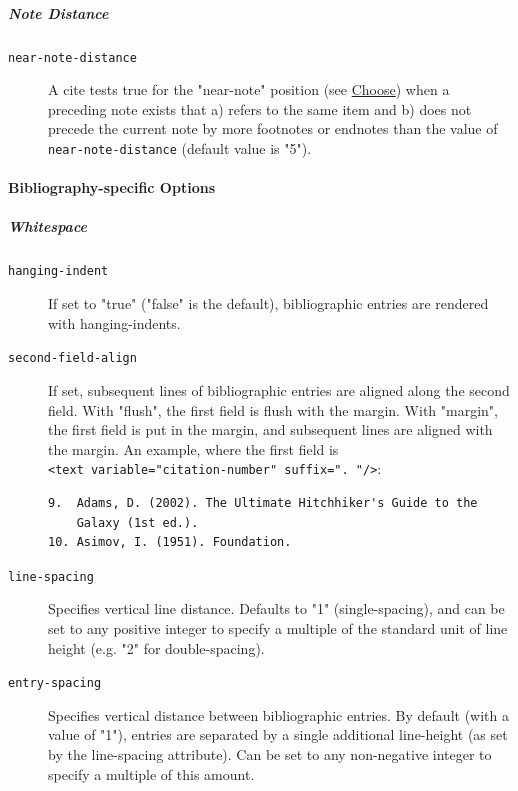 \hypertarget{note-distance}{%
\subparagraph{Note Distance}\label{note-distance}}

\begin{description}
\item[\texttt{near-note-distance}]
A cite tests true for the "near-note" position (see
\protect\hyperlink{choose}{Choose}) when a preceding note exists that a)
refers to the same item and b) does not precede the current note by more
footnotes or endnotes than the value of \texttt{near-note-distance}
(default value is "5").
\end{description}

\hypertarget{bibliography-specific-options}{%
\paragraph{Bibliography-specific
Options}\label{bibliography-specific-options}}

\hypertarget{whitespace}{%
\subparagraph{Whitespace}\label{whitespace}}

\begin{description}
\item[\texttt{hanging-indent}]
If set to "true" ("false" is the default), bibliographic entries are
rendered with hanging-indents.
\item[\texttt{second-field-align}]
If set, subsequent lines of bibliographic entries are aligned along the
second field. With "flush", the first field is flush with the margin.
With "margin", the first field is put in the margin, and subsequent
lines are aligned with the margin. An example, where the first field is
\texttt{\textless{}text\ variable="citation-number"\ suffix=".\ "/\textgreater{}}:

\begin{verbatim}
9.  Adams, D. (2002). The Ultimate Hitchhiker's Guide to the
    Galaxy (1st ed.).
10. Asimov, I. (1951). Foundation.
\end{verbatim}
\item[\texttt{line-spacing}]
Specifies vertical line distance. Defaults to "1" (single-spacing), and
can be set to any positive integer to specify a multiple of the standard
unit of line height (e.g. "2" for double-spacing).
\item[\texttt{entry-spacing}]
Specifies vertical distance between bibliographic entries. By default
(with a value of "1"), entries are separated by a single additional
line-height (as set by the line-spacing attribute). Can be set to any
non-negative integer to specify a multiple of this amount.
\end{description}

